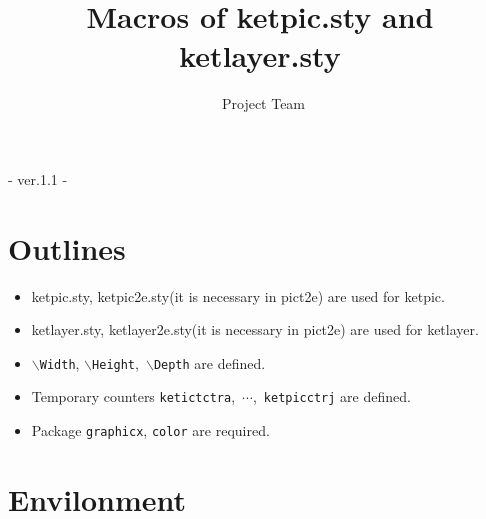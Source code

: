\documentclass[papersize,a4paper,12pt]{article}
\newcommand{\bs}{$\backslash$}
\begin{document}
\title{Macros of ketpic.sty and ketlayer.sty}
\author{\ketcindy\ Project Team}
\maketitle

\begin{center}  - ver.1.1 -\end{center}



\section{Outlines}

\begin{itemize}
\item ketpic.sty, ketpic2e.sty(it is necessary in pict2e) are used for ketpic.
\item ketlayer.sty, ketlayer2e.sty(it is necessary in pict2e) are used for ketlayer.
\item \bs\verb|Width|, \bs\verb|Height|,\ \bs\verb|Depth| are defined.
\item Temporary counters \verb|ketictctra|,\ $\cdots$,\ \verb|ketpicctrj| are defined.
\item Package \verb|graphicx|, \verb|color| are required.

\end{itemize}


\section{Envilonment}
\end{document}
